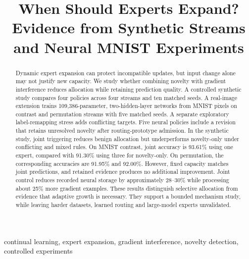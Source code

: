 \documentclass[conference]{IEEEtran}
\title{When Should Experts Expand?\\Evidence from Synthetic Streams and Neural MNIST Experiments}
\author{\IEEEauthorblockN{Mingqi Li and Kaiyue Zhang}
\IEEEauthorblockA{COMPSCI 764 Research Project\\University of Auckland}}
\begin{document}
\maketitle
\thispagestyle{plain}
\pagestyle{plain}
\begin{abstract}
Dynamic expert expansion can protect incompatible updates, but input change alone may not justify new capacity. We study whether combining novelty with gradient interference reduces allocation while retaining prediction quality. A controlled synthetic study compares four policies across four streams and ten matched seeds. A real-image extension trains 109,386-parameter, two-hidden-layer networks from MNIST pixels on contrast and permutation streams with five matched seeds. A separate exploratory label-remapping stress adds conflicting targets. Five neural policies include a revision that retains unresolved novelty after routing-prototype admission. In the synthetic study, joint triggering reduces benign allocation but underperforms novelty-only under conflicting and mixed rules. On MNIST contrast, joint accuracy is 93.61\% using one expert, compared with 91.30\% using three for novelty-only. On permutation, the corresponding accuracies are 91.95\% and 92.00\%. However, fixed capacity matches joint predictions, and retained evidence produces no additional improvement. Joint control reduces recorded neural storage by approximately 28--30\% while processing about 25\% more gradient examples. These results distinguish selective allocation from evidence that adaptive growth is necessary. They support a bounded mechanism study, while leaving harder datasets, learned routing and large-model experts unvalidated.
\end{abstract}
\begin{IEEEkeywords}
continual learning, expert expansion, gradient interference, novelty detection, controlled experiments
\end{IEEEkeywords}







\clearpage

\end{document}

